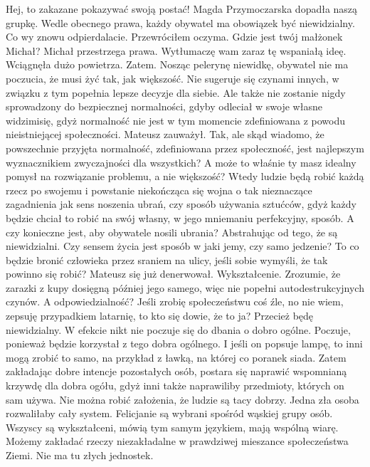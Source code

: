 \begin{dialogue}
\ds{} Hej, to zakazane pokazywać swoją postać! \dm{} Magda Przymoczarska dopadła naszą grupkę. \dm{} Wedle obecnego prawa, każdy obywatel ma obowiązek być niewidzialny.
\ds{} Co wy znowu odpierdalacie. \dm{} Przewróciłem oczyma. \dm{} Gdzie jest twój małżonek Michał?
\ds{} Michał przestrzega prawa. Wytłumaczę wam zaraz tę wspaniałą ideę. \dm{} Wciągnęła dużo powietrza. \dm{} Zatem. Nosząc pelerynę niewidkę, obywatel nie ma poczucia, że musi żyć tak, jak większość. 
Nie sugeruje się czynami innych, w związku z tym popełnia lepsze decyzje dla siebie.
\ds{} Ale także nie zostanie nigdy sprowadzony do bezpiecznej normalności, gdyby odleciał w swoje własne widzimisię, gdyż normalność nie jest w tym momencie zdefiniowana z powodu nieistniejącej społeczności. \dm{} Mateusz zauważył.
\ds{} Tak, ale skąd wiadomo, że powszechnie przyjęta normalność, zdefiniowana przez społeczność, jest najlepszym wyznacznikiem zwyczajności dla wszystkich? 
A może to właśnie ty masz idealny pomysł na rozwiązanie problemu, a nie większość?
\ds{} Wtedy ludzie będą robić każdą rzecz po swojemu i powstanie niekończąca się wojna o tak nieznaczące zagadnienia jak sens noszenia ubrań, czy sposób używania sztućców, gdyż każdy będzie chciał to robić na swój własny, w jego mniemaniu perfekcyjny, sposób.
\ds{} A czy konieczne jest, aby obywatele nosili ubrania? Abstrahując od tego, że są niewidzialni. Czy sensem życia jest sposób w jaki jemy, czy samo jedzenie?
\ds{} To co będzie bronić człowieka przez sraniem na ulicy, jeśli sobie wymyśli, że tak powinno się robić? \dm{} Mateusz się już denerwował.
\ds{} Wykształcenie. Zrozumie, że zarazki z kupy dosięgną później jego samego, więc nie popełni autodestrukcyjnych czynów.
\ds{} A odpowiedzialność? Jeśli zrobię społeczeństwu coś źle, no nie wiem, zepsuję przypadkiem latarnię, to kto się dowie, że to ja? Przecież będę niewidzialny.
W efekcie nikt nie poczuje się do dbania o dobro ogólne.
\ds{} Poczuje, ponieważ będzie korzystał z tego dobra ogólnego. I jeśli on popsuje lampę, to inni mogą zrobić to samo, na przykład z ławką, na której co poranek siada.
Zatem zakładając dobre intencje pozostałych osób, postara się naprawić wspomnianą krzywdę dla dobra ogółu, gdyż inni także naprawiliby przedmioty, których on sam używa.
\ds{} Nie można robić założenia, że ludzie są tacy dobrzy. Jedna zła osoba rozwaliłaby cały system.
\ds{} Felicjanie są wybrani spośród wąskiej grupy osób. Wszyscy są wykształceni, mówią tym samym językiem, mają wspólną wiarę. 
Możemy zakładać rzeczy niezakładalne w prawdziwej mieszance społeczeństwa Ziemi. Nie ma tu złych jednostek.
\end{dialogue}
